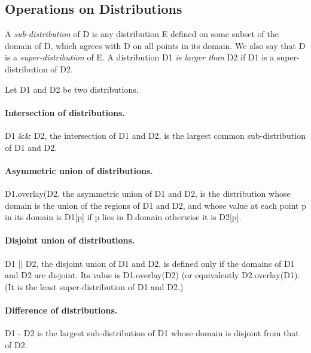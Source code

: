 \subsection{Operations on Distributions}

A {\em sub-distribution} of {\cf D} is any
distribution {\cf E} defined on some subset of the domain of {\cf D},
which agrees with {\cf D} on all points in its domain. We also say
that {\cf D} is a {\em super-distribution} of {\cf E}. A distribution
{\cf D1} {\em is larger than} {\cf D2} if {\cf D1} is a
super-distribution of {\cf D2}.

Let {\cf D1} and {\cf D2} be two distributions.  


\paragraph{Intersection of distributions.}
{\cf D1 \&\& D2}, the intersection of {\cf D1} and {\cf D2}, is the
largest common sub-distribution of {\cf D1} and {\cf D2}.

\paragraph{Asymmetric union of distributions.}
{\cf D1.overlay(D2}, the asymmetric union of {\cf D1} and {\cf D2}, is the
distribution whose domain is the union of the regions of {\cf D1} and
{\cf D2}, and whose value at each point {\cf p} in its domain is {\cf D1[p]}
if {\cf p} lies in {\cf D.domain} otherwise it is {\cf D2[p]}.

\paragraph{Disjoint union of distributions.}
{\cf D1 || D2}, the disjoint union of {\cf D1} and {\cf D2}, is
defined only if the domains of {\cf D1} and {\cf D2} are disjoint. Its
value is {\cf D1.overlay(D2)} (or equivalently {\cf D2.overlay(D1)}.
(It is the least super-distribution of {\cf D1} and {\cf D2}.)

\paragraph{Difference of distributions.}
{\cf D1 - D2} is the largest sub-distribution of {\cf D1} whose domain is
disjoint from that of {\cf D2}.


